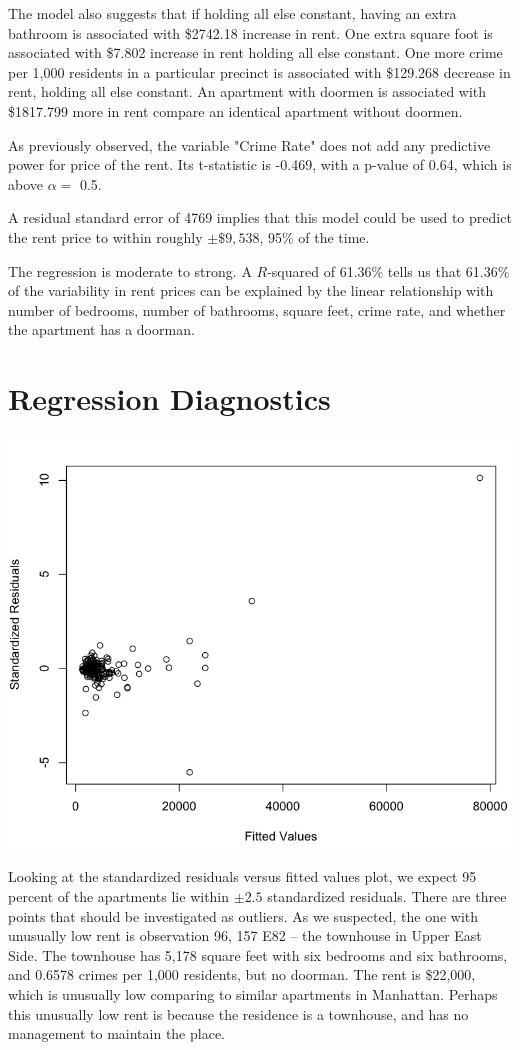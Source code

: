 \documentclass[a4 paper, 11 pt, twocolumn]{article}
\begin{document}
The model also suggests that if holding all else constant, having an extra bathroom is associated with \$2742.18 increase in rent. One extra square foot is associated with \$7.802 increase in rent holding all else constant. One more crime per 1,000 residents in a particular precinct is associated with \$129.268 decrease in rent, holding all else constant. An apartment with doormen is associated with \$1817.799 more in rent compare an identical apartment without doormen.

As previously observed, the variable "Crime Rate" does not add any predictive power for price of the rent. Its t-statistic is -0.469, with a p-value of 0.64, which is above $\alpha=$ 0.5.

A residual standard error of 4769 implies that this model could be used to predict the rent price to within roughly $\pm \$9,538$, 95\% of the time.

The regression is moderate to strong. A $R$-squared of 61.36\% tells us that 61.36\% of the variability in rent prices can be explained by the linear relationship with number of bedrooms, number of bathrooms, square feet, crime rate, and whether the apartment has a doorman.

\section{Regression Diagnostics}
\begin{center}
\includegraphics[scale=0.25]{residual}
\end{center}
Looking at the standardized residuals versus fitted values plot, we expect 95 percent of the apartments lie within $\pm 2.5$ standardized residuals. There are three points that should be investigated as outliers. As we suspected, the one with unusually low rent is observation 96, 157 E82 -- the townhouse in Upper East Side. The townhouse has 5,178 square feet with six bedrooms and six bathrooms, and 0.6578 crimes per 1,000 residents, but no doorman. The rent is \$22,000, which is unusually low comparing to similar apartments in Manhattan. Perhaps this unusually low rent is because the residence is a townhouse, and has no management to maintain the place.
\end{document}
